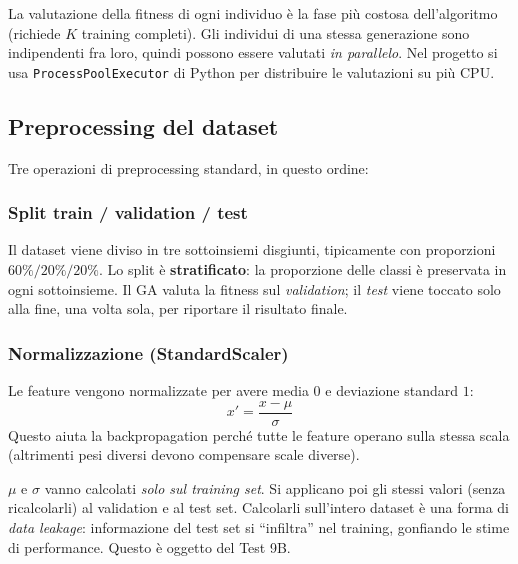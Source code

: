 \documentclass[11pt,a4paper]{article}
\begin{document}
\begin{concetto}
La valutazione della fitness di ogni individuo è la fase più costosa
dell'algoritmo (richiede $K$ training completi). Gli individui di una
stessa generazione sono indipendenti fra loro, quindi possono essere
valutati \emph{in parallelo}. Nel progetto si usa
\texttt{ProcessPoolExecutor} di Python per distribuire le valutazioni su
più CPU.
\end{concetto}

\subsection{Preprocessing del dataset}

Tre operazioni di preprocessing standard, in questo ordine:

\subsubsection{Split train / validation / test}

Il dataset viene diviso in tre sottoinsiemi disgiunti, tipicamente con
proporzioni $60\%/20\%/20\%$. Lo split è \textbf{stratificato}: la
proporzione delle classi è preservata in ogni sottoinsieme. Il GA
valuta la fitness sul \emph{validation}; il \emph{test} viene toccato
solo alla fine, una volta sola, per riportare il risultato finale.

\subsubsection{Normalizzazione (StandardScaler)}

Le feature vengono normalizzate per avere media $0$ e deviazione
standard $1$:
\[ x' = \frac{x - \mu}{\sigma} \]
Questo aiuta la backpropagation perché tutte le feature operano sulla
stessa scala (altrimenti pesi diversi devono compensare scale diverse).

\begin{attenzione}
$\mu$ e $\sigma$ vanno calcolati \emph{solo sul training set}. Si applicano
poi gli stessi valori (senza ricalcolarli) al validation e al test set.
Calcolarli sull'intero dataset è una forma di \emph{data leakage}:
informazione del test set si ``infiltra'' nel training, gonfiando le
stime di performance. Questo è oggetto del Test 9B.
\end{attenzione}
\end{document}

